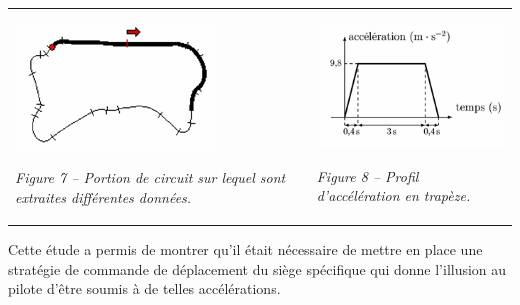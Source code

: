 \documentclass[10pt,fleqn]{article} %
\begin{document}
\begin{center}
\begin{tabular}{p{.45\linewidth}p{.45\linewidth}}

\begin{center}
\includegraphics[width=.9\linewidth]{images/fig_07}

\textit{Figure 7 -- Portion de circuit sur lequel sont extraites différentes données.}
\end{center}
& 
\begin{center}
\includegraphics[width=.9\linewidth]{images/fig_08}

\textit{Figure 8 -- Profil d'accélération en trapèze.}
\end{center}

\end{tabular}
\end{center}

Cette étude a permis de montrer qu'il était nécessaire de mettre en place une stratégie de commande de déplacement du siège spécifique qui donne l'illusion au pilote d'être soumis à de telles accélérations. 
\end{document}
